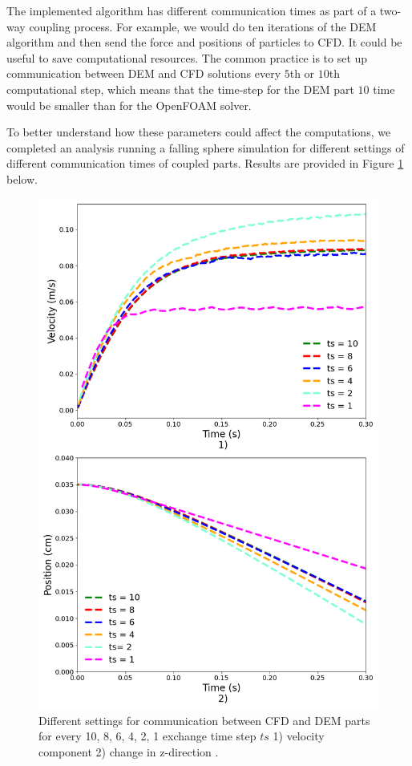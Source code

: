 The implemented algorithm has different communication times as part of a two-way coupling process. For example, we would do ten iterations of the DEM algorithm and then send the force and positions of particles to CFD. It could be useful to save computational resources. The common practice is to set up communication between DEM and CFD solutions every $5$th or $10$th computational step, which means that the time-step for the DEM part $10$ time would be smaller than for the OpenFOAM solver.

To better understand how these parameters could affect the computations, we completed an analysis running a falling sphere simulation for different settings of different communication times of coupled parts. Results are provided in Figure \ref{fig:communication} below.

\begin{figure}[!h]
    \centering
    \includegraphics[width=13cm]{Images/chap3/nan_simulation_192000_diff_exchange_time.png}
   \caption{Different settings for communication between CFD and DEM parts for every 10, 8, 6, 4, 2, 1 exchange time step  $ts$ 1) velocity component 2) change in z-direction .}
    \label{fig:communication}
\end{figure}


